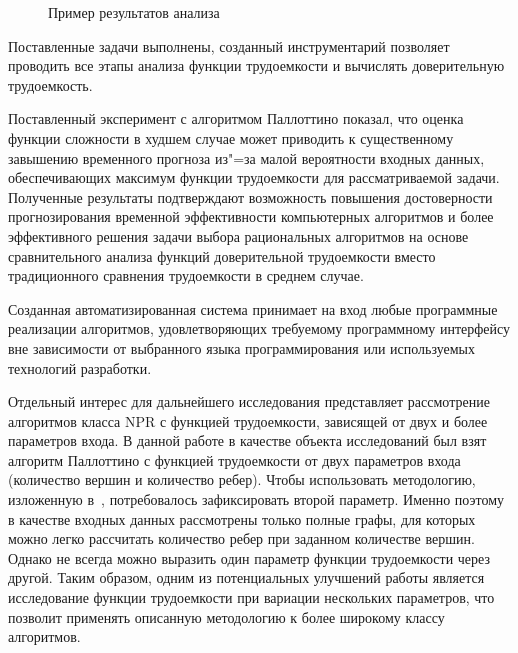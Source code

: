 \documentclass[a4paper, article, 14pt]{extarticle}
\begin{document}
\begin{figure}[h]
	\caption{Пример результатов анализа}
	\label{fig:results}
\end{figure}

\label{sec:conclusion}

Поставленные задачи выполнены, созданный инструментарий позволяет проводить все этапы анализа функции трудоемкости и вычислять доверительную трудоемкость.

Поставленный эксперимент с алгоритмом Паллоттино показал, что оценка функции сложности в худшем случае может приводить к существенному завышению временного прогноза из"=за малой вероятности входных данных, обеспечивающих максимум функции трудоемкости для рассматриваемой задачи. Полученные результаты подтверждают возможность повышения достоверности прогнозирования временной эффективности компьютерных алгоритмов и более эффективного решения задачи выбора рациональных алгоритмов на основе сравнительного анализа функций доверительной трудоемкости вместо традиционного сравнения трудоемкости в среднем случае.

Созданная автоматизированная система принимает на вход любые программные реализации алгоритмов, удовлетворяющих требуемому программному интерфейсу вне зависимости от выбранного языка программирования или используемых технологий разработки.

Отдельный интерес для дальнейшего исследования представляет рассмотрение алгоритмов класса NPR с функцией трудоемкости, зависящей от двух и более параметров входа. В данной работе в качестве объекта исследований был взят алгоритм Паллоттино с функцией трудоемкости от двух параметров входа (количество вершин и количество ребер). Чтобы использовать методологию, изложенную в~\cite{petrushyn_ulyanov_analysis}, потребовалось зафиксировать второй параметр. Именно поэтому в качестве входных данных рассмотрены только полные графы, для которых можно легко рассчитать количество ребер при заданном количестве вершин. Однако не всегда можно выразить один параметр функции трудоемкости через другой. Таким образом, одним из потенциальных улучшений работы является исследование функции трудоемкости при вариации нескольких параметров, что позволит применять описанную методологию к более широкому классу алгоритмов.
\end{document}
